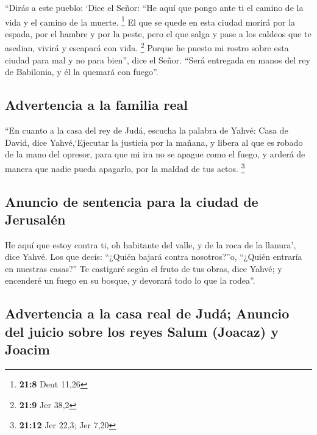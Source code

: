  ``Dirás a este pueblo: `Dice el Señor: ``He aquí que
pongo ante ti el camino de la vida y el camino de la muerte. \footnote{\textbf{21:8}
  Deut 11,26}  El que se quede en esta ciudad morirá por
la espada, por el hambre y por la peste, pero el que salga y pase a los
caldeos que te asedian, vivirá y escapará con vida. \footnote{\textbf{21:9}
  Jer 38,2}  Porque he puesto mi rostro sobre esta ciudad
para mal y no para bien'', dice el Señor. ``Será entregada en manos del
rey de Babilonia, y él la quemará con fuego''.

\hypertarget{advertencia-a-la-familia-real}{%
\subsection{Advertencia a la familia
real}\label{advertencia-a-la-familia-real}}

 ``En cuanto a la casa del rey de Judá, escucha la
palabra de Yahvé:  Casa de David, dice Yahvé,`Ejecutar la
justicia por la mañana, y libera al que es robado de la mano del
opresor, para que mi ira no se apague como el fuego, y arderá de manera
que nadie pueda apagarlo, por la maldad de tus actos. \footnote{\textbf{21:12}
  Jer 22,3; Jer 7,20}

\hypertarget{anuncio-de-sentencia-para-la-ciudad-de-jerusaluxe9n}{%
\subsection{Anuncio de sentencia para la ciudad de
Jerusalén}\label{anuncio-de-sentencia-para-la-ciudad-de-jerusaluxe9n}}

 He aquí que estoy contra ti, oh habitante del valle, y
de la roca de la llanura', dice Yahvé. Los que decís: ``¿Quién bajará
contra nosotros?''o, ``¿Quién entraría en nuestras casas?''
 Te castigaré según el fruto de tus obras, dice Yahvé; y
encenderé un fuego en su bosque, y devorará todo lo que la rodea''.

\hypertarget{advertencia-a-la-casa-real-de-juduxe1-anuncio-del-juicio-sobre-los-reyes-salum-joacaz-y-joacim}{%
\subsection{Advertencia a la casa real de Judá; Anuncio del juicio sobre
los reyes Salum (Joacaz) y
Joacim}\label{advertencia-a-la-casa-real-de-juduxe1-anuncio-del-juicio-sobre-los-reyes-salum-joacaz-y-joacim}}

